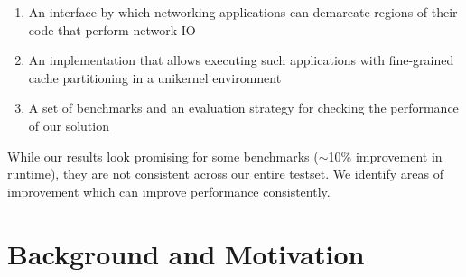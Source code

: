 \documentclass[sigconf,authorversion,noacm]{acmart}
\begin{document}
\begin{enumerate}
    \item An interface by which networking applications can demarcate regions of
        their code that perform network IO
    \item An implementation that allows executing such applications with
        fine-grained cache partitioning in a unikernel environment
    \item A set of benchmarks and an evaluation strategy for checking the
        performance of our solution
\end{enumerate}

While our results look promising for some benchmarks ($\sim$10$\%$ improvement
in runtime), they are not consistent across our entire testset. We identify
areas of improvement which can improve performance consistently.

\section{Background and Motivation}
\end{document}
